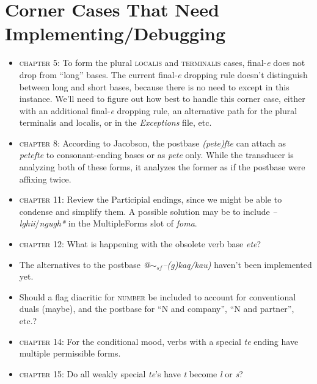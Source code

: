 \documentclass{article}
\begin{document}

\section{Corner Cases That Need Implementing/Debugging}

\begin{itemize}
\renewcommand\labelitemi{$\cdot$}

\item \textsc{chapter 5}: To form the plural \textsc{localis} and \textsc{terminalis} cases, final-\textit{e} does not drop from ``long'' bases.
%
The current final-\textit{e} dropping rule doesn't distinguish between long and short bases, because there is no need to except in this instance.
%
We'll need to figure out how best to handle this corner case, either with an additional final-\textit{e} dropping rule, an alternative path for the plural terminalis and localis, or in the \textit{Exceptions} file, etc.

\item \textsc{chapter 8}: According to Jacobson, the postbase \textit{(pete)fte} can attach as \textit{petefte} to consonant-ending bases or as \textit{pete} only.
%
While the transducer is analyzing both of these forms, it analyzes the former as if the postbase were affixing twice.

\item \textsc{chapter 11}: Review the Participial endings, since we might be able to condense and simplify them.
%
A possible solution may be to include \textit{--lghii}/\textit{ngugh*} in the MultipleForms slot of \textit{foma}.

\item \textsc{chapter 12}: What is happening with the obsolete verb base \textit{ete}?

\item The alternatives to the postbase \textit{@$\sim_{sf}$--(g)kaq/kau)} haven't been implemented yet.

\item Should a flag diacritic for \textsc{number} be included to account for conventional duals (maybe), and the postbase for ``N and company'', ``N and partner'', etc.?

\item \textsc{chapter 14}: For the conditional mood, verbs with a special \textit{te} ending have multiple permissible forms.

\item \textsc{chapter 15}: Do all weakly special \textit{te}'s have \textit{t} become \textit{l} or \textit{s}?


\end{itemize}
\end{document}
